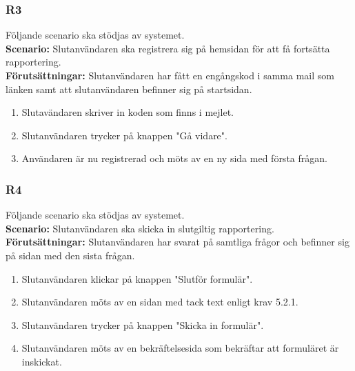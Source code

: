 \documentclass{article}
\begin{document}
        \subsubsection*{R3}
    Följande scenario ska stödjas av systemet.
        \\
       \indent \textbf{Scenario:} Slutanvändaren ska registrera sig på hemsidan för att få fortsätta rapportering.
        \\
       \indent \textbf{Förutsättningar:} Slutanvändaren har fått en engångskod i samma mail som länken samt att slutanvändaren befinner sig på startsidan.
            \begin{enumerate}
               \item Slutavändaren skriver in koden som finns i mejlet.
               \item Slutanvändaren trycker på knappen "Gå vidare".
                \item  Användaren är nu registrerad och möts av en ny sida med första frågan.
            \end{enumerate}
   
        \subsubsection*{R4}
    Följande scenario ska stödjas av systemet.
        \\
       \indent \textbf{Scenario:} Slutanvändaren ska skicka in slutgiltig rapportering.
        \\
       \indent \textbf{Förutsättningar:} Slutanvändaren har svarat på samtliga frågor och befinner sig på sidan med den sista frågan.
            \begin{enumerate}
                \item Slutanvändaren klickar på knappen "Slutför formulär".
                \item Slutanvändaren möts av en sidan med tack text enligt krav 5.2.1.
                \item Slutanvändaren trycker på knappen "Skicka in formulär".
                \item   Slutanvändaren möts av en bekräftelsesida som bekräftar att formuläret är inskickat.
            \end{enumerate}
\end{document}

